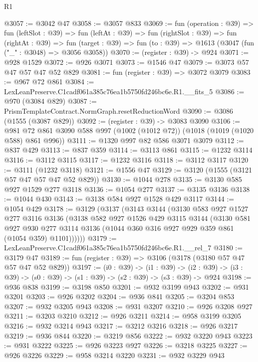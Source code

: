 \begin{lexlean}{R1}
\begin{coremodule}
@3057 := @3042 @47
@3058 := @3057 @833
@3069 := fun (operation : @39) =>
  fun (leftSlot : @39) =>
  fun (leftAt : @39) =>
  fun (rightSlot : @39) =>
  fun (rightAt : @39) =>
  fun (target : @39) => fun (to : @39) => @1613 (@3047 (fun ("_" : @3048) => @3056 @3058))
@3070 := (register : @39) -> @924
@3071 := @928 @1529
@3072 := @926 @3071
@3073 := @1546 @47
@3079 := @3073 @57 @47 @57 @47 @52 @829
@3081 := fun (register : @39) => @3072 @3079
@3083 := @967 @72 @861
@3084 := LexLeanPreserve.C1cadf061a385c76ea1b5750fd246bc6e.R1.__fits_5
@3086 := @970 (@3084 @829)
@3087 := PrismTemplateContract.NormGraph.resetReductionWord
@3090 := @3086 (@1555 (@3087 @829))
@3092 := (register : @39) -> @3083 @3090
@3106 := @981 @72 @861 @3090 @588 @997 (@1002 (@1012 @72)) (@1018 (@1019 (@1020 @588) @861 @996))
@3111 := @1320 @997 @82 @586 @3071 @3079
@3112 := @837 @429
@3113 := @837 @359
@3114 := @3113 @861
@3115 := @1232 @3114
@3116 := @3112 @3115
@3117 := @1232 @3116
@3118 := @3112 @3117
@3120 := @3111 (@1232 @3118)
@3121 := @1556 @47
@3129 := @3120 (@1555 (@3121 @57 @47 @57 @47 @52 @829))
@3130 := @1044 @278
@3135 := @3130 @585 @927 @1529 @277 @3118
@3136 := @1054 @277
@3137 := @3135 @3136
@3138 := @1044 @430
@3143 := @3138 @584 @927 @1528 @429 @3117
@3144 := @1054 @429
@3178 := @3129
    (@3137
      (@3143
        @3144
        (@3130
          @583
          @927
          @1527
          @277
          @3116
          @3136
          (@3138
            @582
            @927
            @1526
            @429
            @3115
            @3144
            (@3130
              @581
              @927
              @930
              @277
              @3114
              @3136
              (@1044 @360 @316 @927 @929 @359 @861 (@1054 @359) @1101))))))
@3179 := LexLeanPreserve.C1cadf061a385c76ea1b5750fd246bc6e.R1.__rel_7
@3180 := @3179 @47
@3189 := fun (register : @39) => @3106 (@3178 (@3180 @57 @47 @57 @47 @52 @829))
@3197 := (i0 : @39) ->
  (i1 : @39) ->
  (i2 : @39) -> (i3 : @39) -> (s0 : @39) -> (s1 : @39) -> (s2 : @39) -> (s3 : @39) -> @924
@3198 := @936 @838
@3199 := @3198 @850
@3201 := @932 @3199 @943
@3202 := @931 @3201
@3203 := @926 @3202
@3204 := @936 @841
@3205 := @3204 @853
@3207 := @932 @3205 @943
@3208 := @931 @3207
@3210 := @926 @3208 @927
@3211 := @3203 @3210
@3212 := @926 @3211
@3214 := @958 @3199 @3205
@3216 := @932 @3214 @943
@3217 := @3212 @3216
@3218 := @926 @3217
@3219 := @936 @844
@3220 := @3219 @856
@3222 := @932 @3220 @943
@3223 := @931 @3222
@3225 := @926 @3223 @927
@3226 := @3218 @3225
@3227 := @926 @3226
@3229 := @958 @3214 @3220
@3231 := @932 @3229 @943

\end{coremodule}
\end{lexlean}

